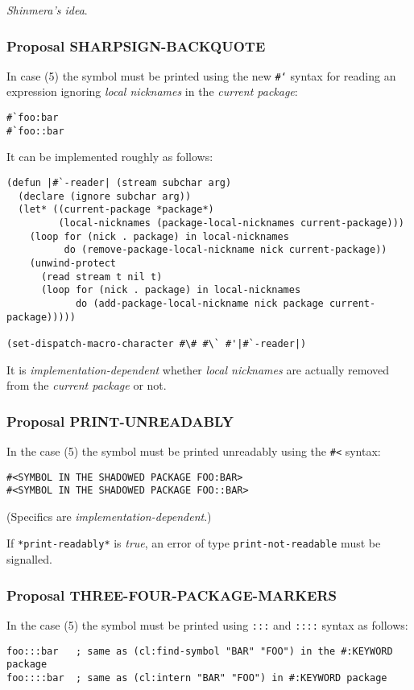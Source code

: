 \documentclass[11pt]{article}
\begin{document}
\emph{Shinmera's idea}.
\subsubsection{Proposal SHARPSIGN-BACKQUOTE}
\label{sec:org1f49d2c}
In case (5) the symbol must be printed using the new \texttt{\#`} syntax for reading an
expression ignoring \emph{local nicknames} in the \emph{current package}:
\begin{verbatim}
#`foo:bar
#`foo::bar
\end{verbatim}

It can be implemented roughly as follows:
\begin{verbatim}
(defun |#`-reader| (stream subchar arg)
  (declare (ignore subchar arg))
  (let* ((current-package *package*)
         (local-nicknames (package-local-nicknames current-package)))
    (loop for (nick . package) in local-nicknames
          do (remove-package-local-nickname nick current-package))
    (unwind-protect
      (read stream t nil t)
      (loop for (nick . package) in local-nicknames
            do (add-package-local-nickname nick package current-package)))))

(set-dispatch-macro-character #\# #\` #'|#`-reader|)
\end{verbatim}
It is \emph{implementation-dependent} whether \emph{local nicknames} are actually removed
from the \emph{current package} or not.
\subsubsection{Proposal PRINT-UNREADABLY}
\label{sec:org0959ad2}
In the case (5) the symbol must be printed unreadably using the \texttt{\#<} syntax:
\begin{verbatim}
#<SYMBOL IN THE SHADOWED PACKAGE FOO:BAR>
#<SYMBOL IN THE SHADOWED PACKAGE FOO::BAR>
\end{verbatim}

(Specifics are \emph{implementation-dependent}.)

If \texttt{*print-readably*} is \emph{true}, an error of type \texttt{print-not-readable} must be
signalled.
\subsubsection{Proposal THREE-FOUR-PACKAGE-MARKERS}
\label{sec:org6a24ee6}
In the case (5) the symbol must be printed using \texttt{:::} and \texttt{::::} syntax as follows:
\begin{verbatim}
foo:::bar   ; same as (cl:find-symbol "BAR" "FOO") in the #:KEYWORD package
foo::::bar  ; same as (cl:intern "BAR" "FOO") in #:KEYWORD package
\end{verbatim}
\end{document}
